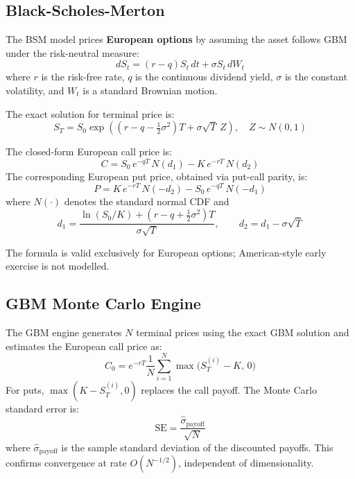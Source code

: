 \documentclass[12pt,a4paper]{article}
\begin{document}
\subsection{Black-Scholes-Merton}

The BSM model prices \textbf{European options} by assuming the asset follows GBM under the risk-neutral measure:
\begin{equation}
dS_t = (r - q)S_t\,dt + \sigma S_t\,dW_t
\end{equation}
where $r$ is the risk-free rate, $q$ is the continuous dividend yield, $\sigma$ is the constant volatility, and $W_t$ is a standard Brownian motion.

The exact solution for terminal price is:
\begin{equation}
S_T = S_0 \exp\!\left((r - q - \tfrac{1}{2}\sigma^2)T + \sigma\sqrt{T}\,Z\right), \quad Z \sim N(0,1)
\end{equation}

The closed-form European call price is:
\begin{equation}
\label{eq:bsm-call}
C = S_0\,e^{-qT}\,N(d_1) - K\,e^{-rT}\,N(d_2)
\end{equation}
The corresponding European put price, obtained via put-call parity, is:
\begin{equation}
\label{eq:bsm-put}
P = K\,e^{-rT}\,N(-d_2) - S_0\,e^{-qT}\,N(-d_1)
\end{equation}
where $N(\cdot)$ denotes the standard normal CDF and
\begin{equation}
d_1 = \frac{\ln(S_0/K) + (r - q + \tfrac{1}{2}\sigma^2)T}{\sigma\sqrt{T}}, \qquad d_2 = d_1 - \sigma\sqrt{T}
\end{equation}

The formula is valid exclusively for European options; American-style early exercise is not modelled.

\subsection{GBM Monte Carlo Engine}

The GBM engine generates $N$ terminal prices using the exact GBM solution and estimates the European call price as:
\begin{equation}
\hat{C}_0 = e^{-rT} \frac{1}{N}\sum_{i=1}^{N}\max\!\bigl(S_T^{(i)} - K,\, 0\bigr)
\end{equation}
For puts, $\max(K - S_T^{(i)}, 0)$ replaces the call payoff. The Monte Carlo standard error is:
\begin{equation}
\text{SE} = \frac{\hat{\sigma}_{\text{payoff}}}{\sqrt{N}}
\end{equation}
where $\hat{\sigma}_{\text{payoff}}$ is the sample standard deviation of the discounted payoffs. This confirms convergence at rate $O(N^{-1/2})$, independent of dimensionality.
\end{document}
